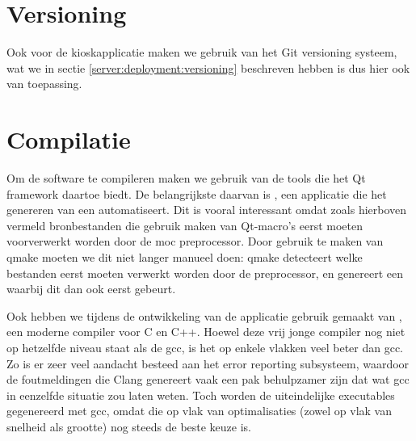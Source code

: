 \section{Versioning}
\label{kiosk:deployment:versioning}

Ook voor de kioskapplicatie maken we gebruik van het Git versioning systeem, wat we in sectie \ref{server:deployment:versioning} beschreven hebben is dus hier ook van toepassing.

\section{Compilatie}
\label{kiosk:deployment:compilatie}

Om de software te compileren maken we gebruik van de tools die het Qt framework daartoe biedt. De belangrijkste daarvan is , een applicatie die het genereren van een  automatiseert. Dit is vooral interessant omdat zoals hierboven vermeld bronbestanden die gebruik maken van Qt-macro's eerst moeten voorverwerkt worden door de \ac{moc} preprocessor. Door gebruik te maken van qmake moeten we dit niet langer manueel doen: qmake detecteert welke bestanden eerst moeten verwerkt worden door de preprocessor, en genereert een  waarbij dit dan ook eerst gebeurt.

Ook hebben we tijdens de ontwikkeling van de applicatie gebruik gemaakt van , een moderne compiler voor C en C++. Hoewel deze vrij jonge compiler nog niet op hetzelfde niveau staat als de \ac{gcc}, is het op enkele vlakken veel beter dan \ac{gcc}. Zo is er zeer veel aandacht besteed aan het error reporting subsysteem, waardoor de foutmeldingen die Clang genereert vaak een pak behulpzamer zijn dat wat \ac{gcc} in eenzelfde situatie zou laten weten. Toch worden de uiteindelijke executables gegenereerd met \ac{gcc}, omdat die op vlak van optimalisaties (zowel op vlak van snelheid als grootte) nog steeds de beste keuze is.

